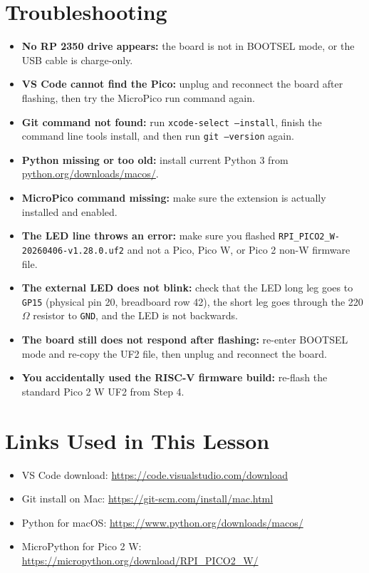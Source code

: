 \documentclass[11pt,letterpaper]{article}
\begin{document}
\section*{Troubleshooting}
\begin{itemize}
    \item \textbf{No RP 2350 drive appears:} the board is not in BOOTSEL mode, or the USB cable is charge-only.
    \item \textbf{VS Code cannot find the Pico:} unplug and reconnect the board after flashing, then try the MicroPico run command again.
    \item \textbf{Git command not found:} run \texttt{xcode-select --install}, finish the command line tools install, and then run \texttt{git --version} again.
    \item \textbf{Python missing or too old:} install current Python 3 from \url{python.org/downloads/macos/}.
    \item \textbf{MicroPico command missing:} make sure the extension is actually installed and enabled.
    \item \textbf{The LED line throws an error:} make sure you flashed \texttt{RPI\_PICO2\_W-20260406-v1.28.0.uf2} and not a Pico, Pico W, or Pico 2 non-W firmware file.
    \item \textbf{The external LED does not blink:} check that the LED long leg goes to \texttt{GP15} (physical pin 20, breadboard row 42), the short leg goes through the 220$\Omega$ resistor to \texttt{GND}, and the LED is not backwards.
    \item \textbf{The board still does not respond after flashing:} re-enter BOOTSEL mode and re-copy the UF2 file, then unplug and reconnect the board.
    \item \textbf{You accidentally used the RISC-V firmware build:} re-flash the standard Pico 2 W UF2 from Step 4.
\end{itemize}

\section*{Links Used in This Lesson}
\begin{itemize}
    \item VS Code download: \url{https://code.visualstudio.com/download}
    \item Git install on Mac: \url{https://git-scm.com/install/mac.html}
    \item Python for macOS: \url{https://www.python.org/downloads/macos/}
    \item MicroPython for Pico 2 W: \url{https://micropython.org/download/RPI_PICO2_W/}
\end{itemize}
\end{document}
